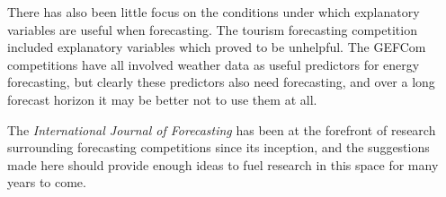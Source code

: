 \documentclass[11pt,a4paper,]{article}
\begin{document}
There has also been little focus on the conditions under which explanatory variables are useful when forecasting. The tourism forecasting competition included explanatory variables which proved to be unhelpful. The GEFCom competitions have all involved weather data as useful predictors for energy forecasting, but clearly these predictors also need forecasting, and over a long forecast horizon it may be better not to use them at all.

The \emph{International Journal of Forecasting} has been at the forefront of research surrounding forecasting competitions since its inception, and the suggestions made here should provide enough ideas to fuel research in this space for many years to come.

\printbibliography
\end{document}
